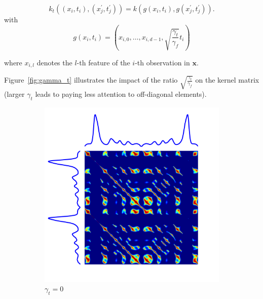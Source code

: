 \begin{equation}
    k_t((x_i, t_i), (x^\prime_j, t^\prime_j)) = k(g(x_i, t_i), g(x^\prime_j, t^\prime_j)).
\end{equation}
with
\begin{equation}
g(x_i, t_i) = \left( x_{i,0}, \dots , x_{i, d-1},
                            \sqrt{\frac{\gamma_t}{\gamma_f}} t_i \right)
\end{equation}

\noindent
where $x_{i,l}$ denotes the $l$-th feature of the $i$-th observation in
$\mathbf{x}$.

Figure~\ref{fig:gamma_t} illustrates the impact of the ratio
$\sqrt{\frac{\gamma_t}{\gamma_f}}$ on the kernel matrix (larger $\gamma_t$
leads to paying less attention to off-diagonal elements).

\begin{figure}[t]
    \begin{subfigure}[b]{0.3\textwidth}
         \centering
         \includegraphics[width=\textwidth]{fig/gram_gammat0}
         \caption{$\gamma_t = 0$}
     \end{subfigure}
     \hfill
     \begin{subfigure}[b]{0.3\textwidth}
          \centering

\end{subfigure}
\end{figure}
